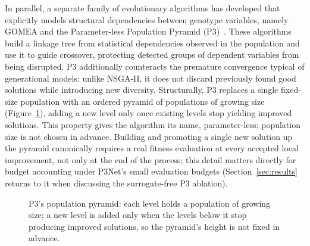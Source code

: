 In parallel, a separate family of evolutionary algorithms has developed that explicitly models structural dependencies between genotype variables, namely GOMEA and the Parameter-less Population Pyramid (P3)~\citep{thierens2011optimal,goldman2014parameterless}. These algorithms build a linkage tree from statistical dependencies observed in the population and use it to guide crossover, protecting detected groups of dependent variables from being disrupted. P3 additionally counteracts the premature convergence typical of generational models: unlike NSGA-II, it does not discard previously found good solutions while introducing new diversity. Structurally, P3 replaces a single fixed-size population with an ordered pyramid of populations of growing size (Figure~\ref{fig:p3-pyramid}), adding a new level only once existing levels stop yielding improved solutions. This property gives the algorithm its name, parameter-less: population size is not chosen in advance. Building and promoting a single new solution up the pyramid canonically requires a real fitness evaluation at every accepted local improvement, not only at the end of the process; this detail matters directly for budget accounting under P3Net's small evaluation budgets (Section~\ref{sec:results} returns to it when discussing the surrogate-free P3 ablation).

\begin{figure}[t]
    \centering
    \caption{P3's population pyramid: each level holds a population of growing size; a new level is added
    only when the levels below it stop producing improved solutions, so the pyramid's height is not fixed
    in advance.}
    \label{fig:p3-pyramid}
\end{figure}

